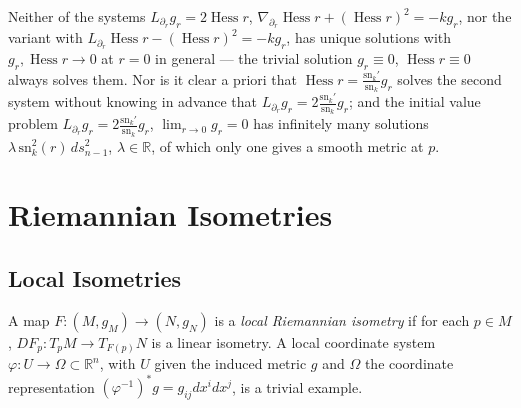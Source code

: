 \begin{remark}
  \label{rem:pet-ch5-uniqueness-remark-5-5-9}

  Neither of the systems $L_{\partial_r}g_r=2\operatorname{Hess}r$,
  $\nabla_{\partial_r}\operatorname{Hess}r+(\operatorname{Hess}r)^2=-kg_r$, nor the
  variant with $L_{\partial_r}\operatorname{Hess}r-(\operatorname{Hess}r)^2=-kg_r$,
  has unique solutions with $g_r,\operatorname{Hess}r\to0$ at $r=0$ in general — the
  trivial solution $g_r\equiv0$, $\operatorname{Hess}r\equiv0$ always solves them.
  Nor is it clear a priori that $\operatorname{Hess}r=\tfrac{\mathrm{sn}_k'}{\mathrm{sn}_k}g_r$
  solves the second system without knowing in advance that $L_{\partial_r}g_r=
  2\tfrac{\mathrm{sn}_k'}{\mathrm{sn}_k}g_r$; and the initial value problem
  $L_{\partial_r}g_r=2\tfrac{\mathrm{sn}_k'}{\mathrm{sn}_k}g_r$, $\lim_{r\to0}g_r=0$ has
  infinitely many solutions $\lambda\,\mathrm{sn}_k^2(r)\,ds_{n-1}^2$, $\lambda\in
  \mathbb R$, of which only one gives a smooth metric at $p$.
\end{remark}

\section{Riemannian Isometries}

\subsection{Local Isometries}

\begin{definition}
  \label{def:pet-ch5-local-isometry}


  A map $F:(M,g_M)\to(N,g_N)$ is a \emph{local Riemannian isometry} if for each
  $p\in M$, $DF_p:T_pM\to T_{F(p)}N$ is a linear isometry. A local coordinate
  system $\varphi:U\to\Omega\subset\mathbb R^n$, with $U$ given the induced metric
  $g$ and $\Omega$ the coordinate representation $(\varphi^{-1})^*g=g_{ij}dx^idx^j$,
  is a trivial example.
\end{definition}

